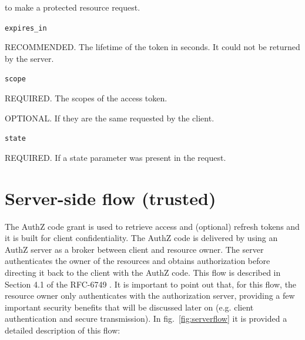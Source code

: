 \hspace{0.5cm}to make a protected resource request.

\texttt{expires\_in}

\hspace{0.5cm}RECOMMENDED. The lifetime of the token in seconds. It could not be returned by the server.

\texttt{scope}

\hspace{0.5cm}REQUIRED. The scopes of the access token.

\hspace{0.5cm}OPTIONAL. If they are the same requested by the client.

\texttt{state}

\hspace{0.5cm}REQUIRED. If a state parameter was present in the request.

\section{Server-side flow (trusted)}
\label{authcg}

The AuthZ code grant is used to retrieve access and (optional) refresh tokens and it is built for client confidentiality. The AuthZ code is delivered by using an AuthZ server as a broker between client and resource owner. The server authenticates the owner of the resources and obtains authorization before directing it back to the client with the AuthZ code. This flow is described in Section 4.1 of the RFC-6749 \cite{RFC6749}. It is important to point out that, for this flow, the resource owner only authenticates with the authorization server, providing a few important security benefits that will be discussed later on (e.g. client authentication and secure transmission). In fig.~\ref{fig:serverflow} it is provided a detailed description of this flow:

